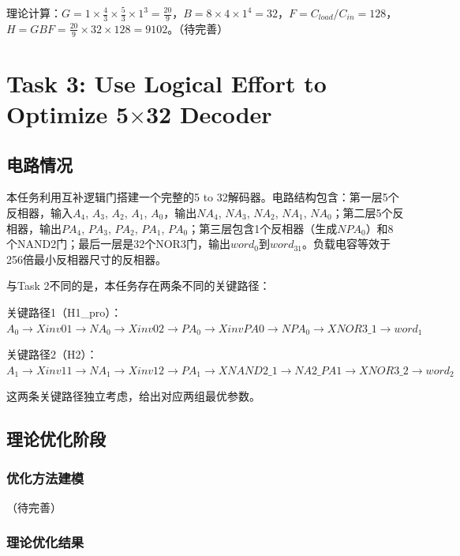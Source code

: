 \documentclass[UTF8,12pt,a4paper]{ctexart}
\begin{document}
理论计算：$G = 1 \times \frac{4}{3} \times \frac{5}{3} \times 1^3 = \frac{20}{9}$，$B = 8 \times 4 \times 1^4 = 32$，$F = C_{load}/C_{in} = 128$，$H = GBF = \frac{20}{9} \times 32 \times 128 = 9102$。（待完善）


\section{Task 3: Use Logical Effort to Optimize 5$\times$32 Decoder}

\subsection{电路情况}

本任务利用互补逻辑门搭建一个完整的5 to 32解码器。电路结构包含：第一层5个反相器，输入$A_4$, $A_3$, $A_2$, $A_1$, $A_0$，输出$NA_4$, $NA_3$, $NA_2$, $NA_1$, $NA_0$；第二层5个反相器，输出$PA_4$, $PA_3$, $PA_2$, $PA_1$, $PA_0$；第三层包含1个反相器（生成$NPA_0$）和8个NAND2门；最后一层是32个NOR3门，输出$word_0$到$word_{31}$。负载电容等效于256倍最小反相器尺寸的反相器。

与Task 2不同的是，本任务存在两条不同的关键路径：

关键路径1（H1\_pro）：$A_0 \rightarrow Xinv01 \rightarrow NA_0 \rightarrow Xinv02 \rightarrow PA_0 \rightarrow XinvPA0 \rightarrow NPA_0 \rightarrow XNOR3\_1 \rightarrow word_1$

关键路径2（H2）：$A_1 \rightarrow Xinv11 \rightarrow NA_1 \rightarrow Xinv12 \rightarrow PA_1 \rightarrow XNAND2\_1 \rightarrow NA2\_PA1 \rightarrow XNOR3\_2 \rightarrow word_2$

这两条关键路径独立考虑，给出对应两组最优参数。

\subsection{理论优化阶段}

\subsubsection{优化方法建模}

（待完善）

\subsubsection{理论优化结果}
\end{document}
